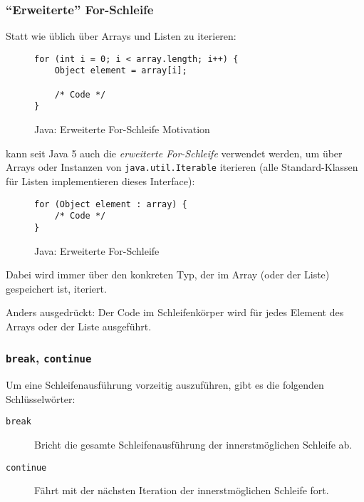 	\subsubsection{\enquote{Erweiterte} For-Schleife}
		Statt wie üblich über Arrays und Listen zu iterieren:
		\begin{figure}[H]
			\centering
			\begin{lstlisting}
for (int i = 0; i < array.length; i++) {
	Object element = array[i];

	/* Code */
}
			\end{lstlisting}
			\caption{Java: Erweiterte For-Schleife Motivation}
		\end{figure}
		kann seit Java 5 auch die \textit{erweiterte For-Schleife} verwendet werden, um über Arrays oder Instanzen von \texttt{java.util.Iterable} iterieren (alle Standard-Klassen für Listen implementieren dieses Interface):
		\begin{figure}[H]
			\centering
			\begin{lstlisting}
for (Object element : array) {
	/* Code */
}
			\end{lstlisting}
			\caption{Java: Erweiterte For-Schleife}
		\end{figure}
		Dabei wird immer über den konkreten Typ, der im Array (oder der Liste) gespeichert ist, iteriert.
		
		Anders ausgedrückt: Der Code im Schleifenkörper wird für jedes Element des Arrays oder der Liste ausgeführt.
	
	\subsubsection{\texttt{break}, \texttt{continue}}
		Um eine Schleifenausführung vorzeitig auszuführen, gibt es die folgenden Schlüsselwörter:
		\begin{description}
			\item[\texttt{break}] Bricht die gesamte Schleifenausführung der innerstmöglichen Schleife ab.
			\item[\texttt{continue}] Fährt mit der nächsten Iteration der innerstmöglichen Schleife fort.
		\end{description}
		

